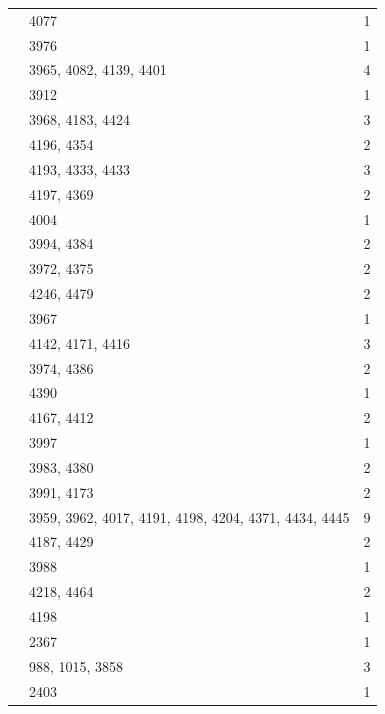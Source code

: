 \begin{longtable}{@{}p{}p{}p{}@{}}
\cite[(2.4)(c)]{Geck1999GGGR} & 4077 & 1 \\
\cite[(3.3)]{Geck1999GGGR} & 3976 & 1 \\
\cite[(3.3)(b)]{Geck1999GGGR} & 3965, 4082, 4139, 4401 & 4 \\
\cite[(4.2)]{Geck1999GGGR} & 3912 & 1 \\
\cite[(4.3)]{Geck1999GGGR} & 3968, 4183, 4424 & 3 \\
\cite[(4.4)(a)]{Geck1999GGGR} & 4196, 4354 & 2 \\
\cite[(4.4)(a)--(b)]{Geck1999GGGR} & 4193, 4333, 4433 & 3 \\
\cite[(4.4)(b)]{Geck1999GGGR} & 4197, 4369 & 2 \\
\cite[(4.7)]{Geck1999GGGR} & 4004 & 1 \\
\cite[(4.7)(a)--(c)]{Geck1999GGGR} & 3994, 4384 & 2 \\
\cite[(4.9)]{Geck1999GGGR} & 3972, 4375 & 2 \\
\cite[(6.1)(c)]{Geck1999GGGR} & 4246, 4479 & 2 \\
\cite[Basic assumptions, p.~140]{Geck1999GGGR} & 3967 & 1 \\
\cite[Corollary~3.2]{Geck1999GGGR} & 4142, 4171, 4416 & 3 \\
\cite[Propositions~5.3 and 5.5]{Geck1999GGGR} & 3974, 4386 & 2 \\
\cite[Propositions~5.3 and~5.5]{Geck1999GGGR} & 4390 & 1 \\
\cite[Proposition~3.1]{Geck1999GGGR} & 4167, 4412 & 2 \\
\cite[Proposition~5.3]{Geck1999GGGR} & 3997 & 1 \\
\cite[Remark~3.4 and the proof of Theorem~3.8]{Geck1999GGGR} & 3983, 4380 & 2 \\
\cite[Theorem~3.8]{Geck1999GGGR} & 3991, 4173 & 2 \\
\cite[Theorem~4.5]{Geck1999GGGR} & 3959, 3962, 4017, 4191, 4198, 4204, 4371, 4434, 4445 & 9 \\
\cite[Theorem~7.1]{Geck1999GGGR} & 4187, 4429 & 2 \\
\cite[p.~151]{Geck1999GGGR} & 3988 & 1 \\
\cite[Corollary~3.5]{GeckHezard2008} & 4218, 4464 & 2 \\
\cite[Proposition~2.3]{GeckHezard2008} & 4198 & 1 \\
\cite[Proposition~2.4]{GeckHezard2008} & 2367 & 1 \\
\cite[Proposition~4.3]{GeckHezard2008} & 988, 1015, 3858 & 3 \\
\cite[p.~821]{GeckHezard2008} & 2403 & 1 \\

\end{longtable}
